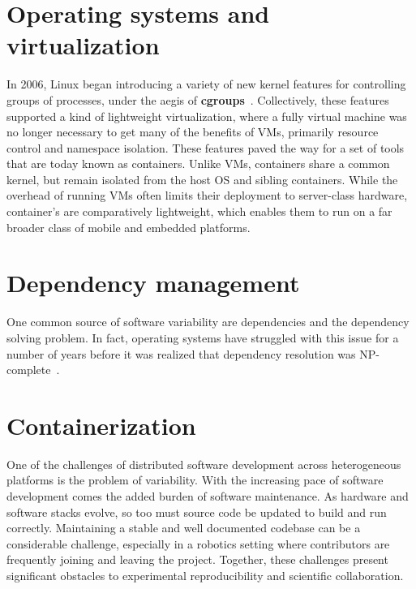 \documentclass[12pt,initial,twoside,maitrise]{dms}
\numberwithin{equation}{section}
\numberwithin{table}{chapter}
\numberwithin{figure}{chapter}
\begin{document}
\section{Operating systems and virtualization}\label{sec:os-and-virtualization}

In 2006, Linux began introducing a variety of new kernel features for controlling groups of processes, under the aegis of \textbf{cgroups}~\cite{menage2007adding}. Collectively, these features supported a kind of lightweight virtualization, where a fully virtual machine was no longer necessary to get many of the benefits of VMs, primarily resource control and namespace isolation. These features paved the way for a set of tools that are today known as containers. Unlike VMs, containers share a common kernel, but remain isolated from the host OS and sibling containers. While the overhead of running VMs often limits their deployment to server-class hardware, container's are comparatively lightweight, which enables them to run on a far broader class of mobile and embedded platforms.

\section{Dependency management}\label{sec:dependency-management}

One common source of software variability are dependencies and the dependency solving problem. In fact, operating systems have struggled with this issue for a number of years before it was realized that dependency resolution was NP-complete~\cite{abate2012dependency}.

\section{Containerization}\label{sec:containerization}

One of the challenges of distributed software development across heterogeneous platforms is the problem of variability. With the increasing pace of software development comes the added burden of software maintenance. As hardware and software stacks evolve, so too must source code be updated to build and run correctly. Maintaining a stable and well documented codebase can be a considerable challenge, especially in a robotics setting where contributors are frequently joining and leaving the project. Together, these challenges present significant obstacles to experimental reproducibility and scientific collaboration.
\end{document}
